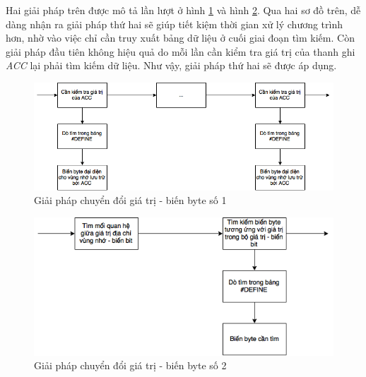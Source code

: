 Hai giải pháp trên được mô tả lần lượt ở hình \ref{fig:waytotransfer1} và hình \ref{fig:waytotransfer2}. Qua hai sơ đồ trên, dễ dàng nhận ra giải pháp thứ hai sẽ giúp tiết kiệm thời gian xử lý chương trình hơn, nhờ vào việc chỉ cần truy xuất bảng dữ liệu ở cuối giai đoạn tìm kiếm. Còn giải pháp đầu tiên không hiệu quả do mỗi lần cần kiểm tra giá trị của thanh ghi \textit{ACC} lại phải tìm kiếm dữ liệu. Như vậy, giải pháp thứ hai sẽ được áp dụng.
\begin{figure}
	\centering
	\includegraphics[width=0.7\linewidth]{image/wayToTransfer1}
	\caption{Giải pháp chuyển đổi giá trị - biến byte số 1}
	\label{fig:waytotransfer1}
\end{figure}
\begin{figure}
	\centering
	\includegraphics[width=0.7\linewidth]{image/wayToTransfer2}
	\caption{Giải pháp chuyển đổi giá trị - biến byte số 2}
	\label{fig:waytotransfer2}
\end{figure}
